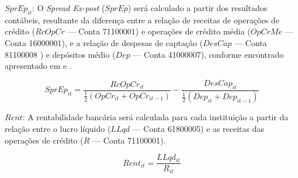 \documentclass[
  12pt,
  12pt,
  openright,
  oneside,
  a4paper,
  chapter=TITLE,
  section=TITLE,
  subsection=TITLE,
  subsubsection=TITLE,
  english,
  portugues,
  sumario=tradicional]{abntex2}
\begin{document}
\(SprEp_{it}\): O \emph{Spread Ex-post} (\(SprEp\)) será calculado a partir dos resultados contábeis, resultante da diferença entre a relação de receitas de operações de crédito (\(RcOpCr\) --- Conta 71100001) e operações de crédito média (\(OpCrMe\) --- Conta 16000001), e a relação de despesas de captação (\(DesCap\) --- Conta 81100008 ) e depósitos médio (\(Dep\) --- Conta 41000007), conforme encontrado apresentado em \textcite{dantas:2012} e \textcite{timotio:2018}.

\begin{equation}\label{eq:sprbase}
SprEp_{it} = \frac{RcOpCr_{it}}{\frac{1}{2}(OpCr_{it} + OpCr_{it-1}) } - \frac{DesCap_{it}}{\frac{1}{2}(Dep_{it} + Dep_{it-1})}
\end{equation}

\(Rent\): A rentabilidade bancária será calculada para cada instituição a partir da relação entre o lucro líquido (\(LLqd\) --- Conta 61800005) e as receitas das operações de crédito (\(R\) --- Conta 71100001).

\begin{equation}
Rent_{it} = \frac{LLqd_{it}}{R_{it}}
\end{equation}

\vspace{20pt}
\vspace{-2mm}
\linespread{2}
\end{document}

